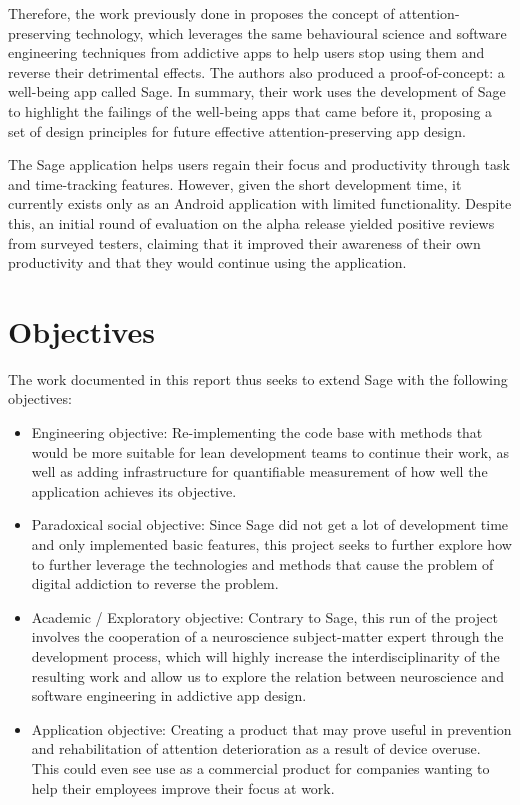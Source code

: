 Therefore, the work previously done in \cite{sagePaper2020} proposes the concept of attention-preserving technology, which leverages the same behavioural science and software engineering techniques from addictive apps to help users stop using them and reverse their detrimental effects. The authors also produced a proof-of-concept: a well-being app called Sage. In summary, their work uses the development of Sage to highlight the failings of the well-being apps that came before it, proposing a set of design principles for future effective attention-preserving app design.

The Sage application helps users regain their focus and productivity through task and time-tracking features. However, given the short development time, it currently exists only as an Android application with limited functionality. Despite this, an initial round of evaluation on the alpha release yielded positive reviews from surveyed testers, claiming that it improved their awareness of their own productivity and that they would continue using the application.

\section{Objectives}
The work documented in this report thus seeks to extend Sage with the following objectives:

\begin{itemize}
    \item Engineering objective: Re-implementing the code base with methods that would be more suitable for lean development teams to continue their work, as well as adding infrastructure for quantifiable measurement of how well the application achieves its objective.
    \item Paradoxical social objective: Since Sage did not get a lot of development time and only implemented basic features, this project seeks to further explore how to further leverage the technologies and methods that cause the problem of digital addiction to reverse the problem.
    \item Academic / Exploratory objective: Contrary to Sage, this run of the project involves the cooperation of a neuroscience subject-matter expert through the development process, which will highly increase the interdisciplinarity of the resulting work and allow us to explore the relation between neuroscience and software engineering in addictive app design.
    \item Application objective: Creating a product that may prove useful in prevention and rehabilitation of attention deterioration as a result of device overuse. This could even see use as a commercial product for companies wanting to help their employees improve their focus at work.
\end{itemize}

